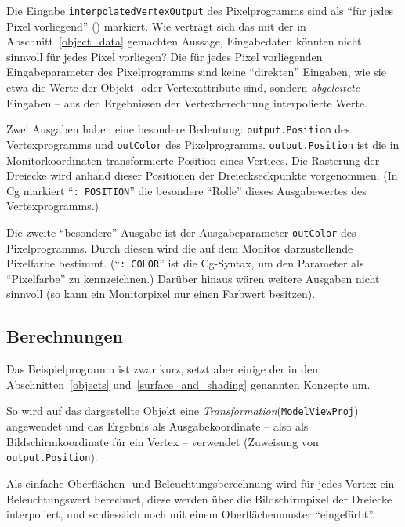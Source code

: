 \documentclass[twoside,a4paper,fleqn,12pt]{book}
\begin{document}
Die Eingabe \verb+interpolatedVertexOutput+ des Pixelprogramms sind als "`für jedes Pixel vorliegend"' () markiert.
Wie verträgt sich das mit der in Abschnitt~\ref{object_data} gemachten Aussage, Eingabedaten könnten nicht sinnvoll für jedes
Pixel vorliegen? Die für jedes Pixel vorliegenden Eingabeparameter des Pixelprogramms sind keine "`direkten"' Eingaben,
wie sie etwa die Werte der Objekt- oder Vertexattribute sind, sondern \emph{abgeleitete} Eingaben --
aus den Ergebnissen der Vertexberechnung interpolierte Werte.

Zwei Ausgaben haben eine besondere Bedeutung: \verb+output.Position+ des Vertexprogramms und \verb+outColor+ des Pixelprogramms.
\verb+output.Position+ ist die in Monitorkoordinaten transformierte Position eines Vertices. Die Rasterung der Dreiecke wird anhand dieser
Positionen der Dreieckseckpunkte vorgenommen. (In Cg markiert ``\verb+: POSITION+'' die besondere "`Rolle"' dieses Ausgabewertes des Vertexprogramms.)

Die zweite "`besondere"' Ausgabe ist der Ausgabeparameter \verb+outColor+ des Pixelprogramms. Durch diesen wird die auf dem Monitor
darzustellende Pixelfarbe bestimmt. (``\verb+: COLOR+'' ist die Cg-Syntax, um den Parameter als "`Pixelfarbe"' zu kennzeichnen.)
Darüber hinaus wären weitere Ausgaben nicht sinnvoll (so kann ein Monitorpixel nur einen Farbwert besitzen).

\subsection{Berechnungen}


Das Beispielprogramm ist zwar kurz, setzt aber einige der in den Abschnitten~\ref{objects} und~\ref{surface_and_shading} genannten Konzepte um.

So wird auf das dargestellte Objekt eine \emph{Transformation}(\verb+ModelViewProj+) angewendet und das Ergebnis als Ausgabekoordinate --
also als Bildschirmkoordinate für ein Vertex -- verwendet (Zuweisung von \verb+output.Position+).

Als einfache Oberflächen- und Beleuchtungsberechnung wird für jedes Vertex ein Beleuchtungswert berechnet, diese werden über die Bildschirmpixel
der Dreiecke interpoliert, und schliesslich noch mit einem Oberflächenmuster "`eingefärbt"'.
\end{document}
